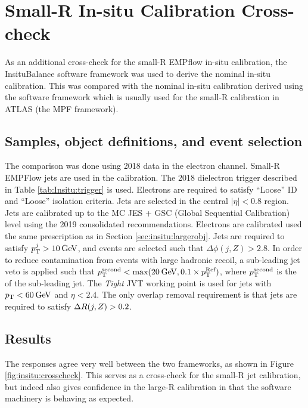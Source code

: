 \section{Small-R In-situ Calibration Cross-check}
As an additional cross-check for the small-R EMPflow \zjets in-situ calibration, the InsituBalance software framework was used to derive the nominal in-situ calibration. This was compared with the nominal in-situ calibration derived using the software framework which is usually used for the small-R calibration in ATLAS (the MPF framework). 

\subsection{Samples, object definitions, and event selection}

The comparison was done using 2018 data in the electron channel. Small-R EMPFlow jets are used in the calibration. The 2018 dielectron trigger described in Table \ref{tab:Insitu:trigger} is used. Electrons are required to satisfy ``Loose'' ID and ``Loose'' isolation criteria. Jets are selected in the central $|\eta|<0.8$ region. Jets are calibrated up to the MC JES + GSC (Global Sequential Calibration) level using the 2019 consolidated recommendations. Electrons are calibrated used the same prescription as in Section \ref{sec:insitu:largerobj}. Jets are required to satisfy $p_{\text{T}}^j>10\hspace{2pt}\text{Ge\kern -0.1em V}$, and events are selected such that $\Delta\phi(j,Z)>2.8$. In order to reduce contamination from events with large hadronic recoil, a sub-leading jet veto is applied such that $p_{\text{T}}^{\text{second}}<\text{max}(20\hspace{2pt}\text{Ge\kern -0.1em V},0.1\times p_{\text{T}}^{\text{Ref}})$, where $p_{\text{T}}^{\text{second}}$ is the \pt of the sub-leading jet. The \textit{Tight} JVT working point is used for jets with $p_{\text{T}}<60\hspace{2pt}\text{Ge\kern -0.1em V}$ and $\eta<2.4$. The only overlap removal requirement is that jets are required to satisfy $\Delta R(j,Z)>0.2$.

\subsection{Results}

The responses agree very well between the two frameworks, as shown in Figure \ref{fig:insitu:crosscheck}. This serves as a cross-check for the small-R jet calibration, but indeed also gives confidence in the large-R calibration in that the software machinery is behaving as expected.

